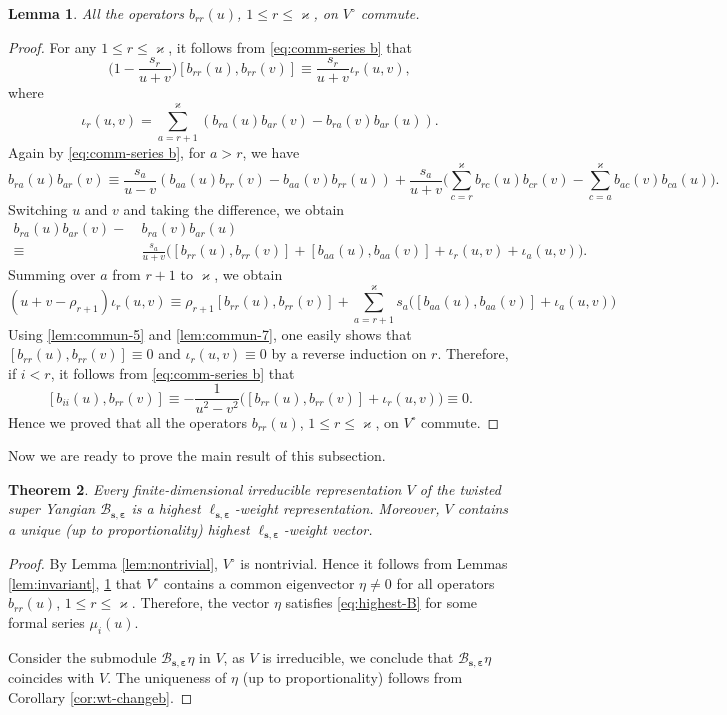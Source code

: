 \documentclass[11pt,reqno]{amsart}
\numberwithin{equation}{section}
\newtheorem{thm}{Theorem}[section]
\newtheorem{lem}[thm]{Lemma}
\theoremstyle{definition}
\theoremstyle{remark}
\newcommand{\beq}{\begin{equation}}
\newcommand{\eeq}{\end{equation}}
\newcommand{\lle}{\leqslant}
\newcommand{\BMN}{{\mathscr{B}_{\bm s,\bm \ve}}}
\newcommand{\ka}{\varkappa}
\newcommand{\ve}{\varepsilon}
\newcommand{\s}{{\bm s}}
\begin{document}
\begin{lem}\label{lem:commute}
All the operators $b_{rr}(u)$, $1\lle r\lle \ka$, on $V^\circ$ commute.
\end{lem}
\begin{proof}
For any $1\lle r\lle \ka$, it follows from \eqref{eq:comm-series b} that
\beq\label{lem:commun-5}
\Big(1-\frac{s_r}{u+v}\Big)[b_{rr}(u),b_{rr}(v)]\equiv \frac{s_r}{u+v}\iota_r(u,v),
\eeq
where
\beq\label{lem:commun-6}
\iota_r(u,v)=\sum_{a=r+1}^\ka(b_{ra}(u)b_{ar}(v)-b_{ra}(v)b_{ar}(u)).
\eeq
Again by \eqref{eq:comm-series b}, for $a > r$, we have
\[
b_{ra}(u)b_{ar}(v)\equiv \frac{s_a}{u-v}(b_{aa}(u)b_{rr}(v)-b_{aa}(v)b_{rr}(u))+\frac{s_a}{u+v}\Big(\sum_{c=r}^\ka b_{rc}(u)b_{cr}(v)-\sum_{c=a}^\ka b_{ac}(v)b_{ca}(u)\Big).
\]
Switching $u$ and $v$ and taking the difference, we obtain
\begin{align*}
 b_{ra}(u)b_{ar}(v)- &\  b_{ra}(v)b_{ar}(u ) \\ \equiv & \
 \frac{s_a}{u+v}\Big([b_{rr}(u),b_{rr}(v)]+[b_{aa}(u),b_{aa}(v)]+\iota_{r}(u,v)+\iota_a(u,v)\Big).
\end{align*}
Summing over $a$ from $r+1$ to $\ka$, we obtain
\beq\label{lem:commun-7}
(u+v-\rho_{r+1})\iota_{r}(u,v) \equiv \rho_{r+1}[b_{rr}(u),b_{rr}(v)]+\sum_{a=r+1}^\ka s_a\Big([b_{aa}(u),b_{aa}(v)]+\iota_a(u,v)\Big)
\eeq
Using \eqref{lem:commun-5} and \eqref{lem:commun-7}, one easily shows that $[b_{rr}(u),b_{rr}(v)]\equiv 0$ and $\iota_r(u,v)\equiv 0$ by a reverse induction on $r$. Therefore, if $i<r$, it follows from \eqref{eq:comm-series b} that
\[
[b_{ii}(u),b_{rr}(v)]\equiv -\frac{1}{u^2-v^2}\Big([b_{rr}(u),b_{rr}(v)]+\iota_r(u,v)\Big)\equiv 0.
\]
Hence we proved that all the operators $b_{rr}(u)$, $1\lle r\lle \ka$, on $V^\circ$ commute.
\end{proof}
Now we are ready to prove the main result of this subsection.
\begin{thm}
Every finite-dimensional irreducible representation $V$ of the twisted super Yangian $\BMN$ is a highest $\ell_{\s,\bm\ve}$-weight representation. Moreover, $V$ contains a unique (up to proportionality) highest $\ell_{\s,\bm\ve}$-weight vector.
\end{thm}
\begin{proof}
By Lemma \ref{lem:nontrivial}, $V^\circ$ is nontrivial. Hence it follows from Lemmas \ref{lem:invariant}, \ref{lem:commute} that $V^\circ$ contains a common eigenvector $\eta\ne 0$ for all operators $b_{rr}(u)$, $1\lle r\lle \ka$. Therefore, the vector $\eta$ satisfies \eqref{eq:highest-B} for some formal series $\mu_i(u)$.

Consider the submodule $\BMN\eta$ in $V$, as $V$ is irreducible, we conclude that $\BMN\eta$ coincides with $V$. The uniqueness of $\eta$ (up to proportionality) follows from Corollary \ref{cor:wt-changeb}.
\end{proof}
\end{document}
